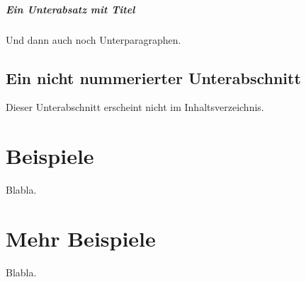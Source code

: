 \documentclass[11pt,a4paper,twoside,openright]{scrbook}
\begin{document}
\subparagraph{Ein Unterabsatz mit Titel}
Und dann auch noch Unterparagraphen.

\subsection*{Ein nicht nummerierter Unterabschnitt}
Dieser Unterabschnitt erscheint nicht im Inhaltsverzeichnis.
\newpage

\section{Beispiele}
Blabla.
\newpage

\section{Mehr Beispiele}
Blabla.
\newpage



\newpage

\listoffigures
\newpage

\listoftables
\newpage

\end{document}
